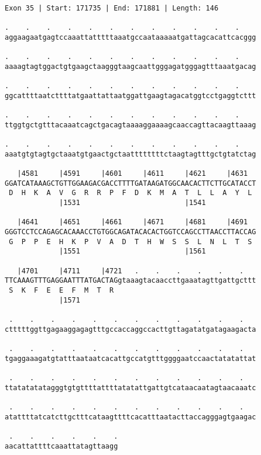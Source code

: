 \documentclass{article}
\begin{document}
\newpage
\begin{Verbatim}[fontfamily=courier]
Exon 35 | Start: 171735 | End: 171881 | Length: 146

.    .    .    .    .    .    .    .    .    .    .    .    
aggaagaatgagtccaaattatttttaaatgccaataaaaatgattagcacattcacggg

.    .    .    .    .    .    .    .    .    .    .    .    
aaaagtagtggactgtgaagctaagggtaagcaattgggagatgggagtttaaatgacag

.    .    .    .    .    .    .    .    .    .    .    .    
ggcattttaatcttttatgaattattaatggattgaagtagacatggtcctgaggtcttt

.    .    .    .    .    .    .    .    .    .    .    .    
ttggtgctgtttacaaatcagctgacagtaaaaggaaaagcaaccagttacaagttaaag

.    .    .    .    .    .    .    .    .    .    .    .    
aaatgtgtagtgctaaatgtgaactgctaattttttttctaagtagtttgctgtatctag

   |4581     |4591     |4601     |4611     |4621     |4631  
GGATCATAAAGCTGTTGGAAGACGACCTTTTGATAAGATGGCAACACTTCTTGCATACCT
 D  H  K  A  V  G  R  R  P  F  D  K  M  A  T  L  L  A  Y  L 
             |1531                         |1541            

   |4641     |4651     |4661     |4671     |4681     |4691  
GGGTCCTCCAGAGCACAAACCTGTGGCAGATACACACTGGTCCAGCCTTAACCTTACCAG
 G  P  P  E  H  K  P  V  A  D  T  H  W  S  S  L  N  L  T  S 
             |1551                         |1561            

   |4701     |4711     |4721   .    .    .    .    .    .   
TTCAAAGTTTGAGGAATTTATGACTAGgtaaagtacaaccttgaaatagttgattgcttt
 S  K  F  E  E  F  M  T  R                                  
             |1571                                          

 .    .    .    .    .    .    .    .    .    .    .    .   
ctttttggttgagaaggagagtttgccaccaggccacttgttagatatgatagaagacta

 .    .    .    .    .    .    .    .    .    .    .    .   
tgaggaaagatgtatttaataatcacattgccatgtttggggaatccaactatatattat

 .    .    .    .    .    .    .    .    .    .    .    .   
ttatatatatagggtgtgttttattttatatattgattgtcataacaatagtaacaaatc

 .    .    .    .    .    .    .    .    .    .    .    .   
atattttatcatcttgctttcataagttttcacatttaatacttaccagggagtgaagac

 .    .    .    .    .    .
aacattattttcaaattatagttaagg
\end{Verbatim}
\end{document}
